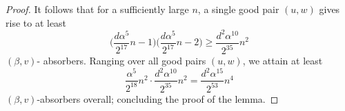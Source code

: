 \documentclass[11pt,reqno]{amsart}
\begin{document}
\begin{proof}
It follows that for a sufficiently large $n$, a single good pair $(u,w)$ gives rise to at least 
$$
\Big(\frac{d\alpha^5}{2^{17}} n -1\Big)\Big(\frac{d\alpha^5}{2^{17}} n -2\Big) \geq \frac{d^2\alpha^{10}}{2^{35}}n^2 
$$
$(\beta,v)$- absorbers. 
Ranging over all good pairs $(u,w)$, we attain at least 
$$
\frac{\alpha^5}{2^{18}}n^2\cdot \frac{d^2\alpha^{10}}{2^{35}}n^2 = \frac{d^2\alpha^{15}}{2^{53}}n^4
$$
$(\beta,v)$-absorbers overall; concluding the proof of the lemma. 
\end{proof}

%
%
%
\end{document}
